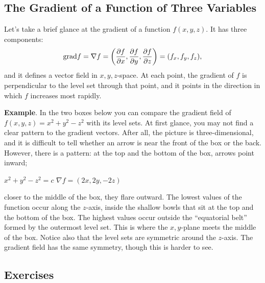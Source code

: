 {{{{\subsection{The Gradient of a Function of Three Variables}

	Let's take a brief glance at the gradient of a function $f(x, y, z)$.  It has three components:
	\[
\mbox{grad} f = \nabla f = \left( {\partial f \over \partial x},
		{\partial f \over \partial y}, {\partial f \over \partial z}
		\right) = (f_x, f_y, f_z),
\]
and it defines a vector field in $x, y, z$-space.  At each point, the gradient of $f$ is perpendicular to the level set through that point, and it points in the direction in which $f$ increases most rapidly.  


{\bf Example}.  In the two boxes below you can compare the gradient field of $f(x, y, z) = x^2 + y^2 - z^2$ with its level sets.  
At first glance, you may not find a clear pattern to the gradient vectors.  After all, the picture is three-dimensional, and it is difficult to tell whether an arrow is near the front of the box or the back.  However, there is a pattern: at the top and the bottom of the box, arrows point inward; 
\linebreak
\vspace{-9pt} 

\vspace{210pt}

{\small
\hspace{40pt}
$x^2 + y^2 - z^2 = c$
\hspace{125pt}
$\nabla f = (2x, 2y, -2z)$
}

\vspace{6pt}
\noindent
closer to the middle of the box, they flare outward.  The lowest values of the function occur along the $z$-axis, inside the shallow bowls that sit at the top and the bottom of the box.  The highest values occur outside the ``equatorial belt'' formed by the outermost level set. This is where the $x, y$-plane meets the middle of the box.  Notice also that the level sets are symmetric around the $z$-axis.  The gradient field has the same symmetry, though this is harder to see.

\subsection{Exercises}


}}}}
